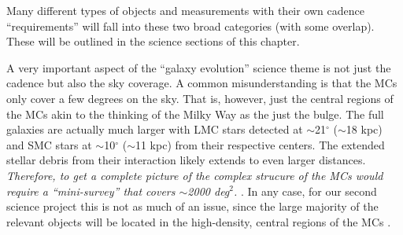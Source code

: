 Many different types of objects and measurements with their own
cadence ``requirements'' will fall into these two broad categories
(with some overlap).  These will be outlined in the science sections
of this chapter.

A very important aspect of the ``galaxy evolution'' science theme is
not just the cadence but also the sky coverage.  A common
misunderstanding is that the MCs only cover a few degrees on the sky.
That is, however, just the central regions of the MCs akin to the
thinking of the Milky Way as the just the bulge.  The full galaxies
are actually much larger with LMC stars detected at $\sim$21$^{\circ}$
($\sim$18 kpc) and SMC stars at $\sim$10$^{\circ}$ ($\sim$11 kpc) from
their respective centers. The extended stellar debris from their
interaction likely extends to even larger distances.  {\it  Therefore,
to get a complete picture of the complex strucure of the MCs would
require a ``mini-survey'' that covers $\sim$2000 deg$^2$.}  .  In any case, for our
second science project this is not as much of an issue, since the
large majority of the relevant objects will be located in the
high-density, central regions of the MCs .


